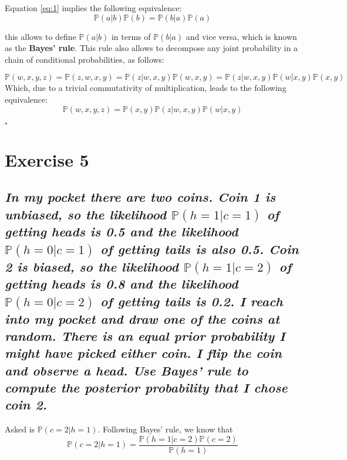 \documentclass[11pt]{scrartcl} %
\begin{document}
        Equation \ref{eq:1} implies the following equivalence:
        \begin{equation}\label{eq:3}
          \mathbb{P}(a|b)\mathbb{P}(b) = \mathbb{P}(b|a)\mathbb{P}(a)
        \end{equation}

        this allows to define \(\mathbb{P}(a|b)\) in terms of \(\mathbb{P}(b|a)\) and vice versa, which is known as the \textbf{Bayes' rule}. This rule also allows to decompose any joint probability in a chain of conditional probabilities, as follows:

        \begin{equation}\label{eq:4}
          \mathbb{P}(w,x,y,z) = \mathbb{P}(z,w,x,y) = \mathbb{P}(z|w,x,y)\mathbb{P}(w,x,y) = \mathbb{P}(z|w,x,y)\mathbb{P}(w|x,y)\mathbb{P}(x,y)
        \end{equation}
        Which, due to a trivial commutativity of multiplication, leads to the following equivalence:
        \begin{equation}\label{eq:5}
          \mathbb{P}(w,x,y,z) = \mathbb{P}(x,y)\mathbb{P}(z|w, x, y)\mathbb{P}(w|x, y)
        \end{equation}
        \begin{flushright}
		$\square$\\
	\end{flushright}



\vspace{5mm}
        \section*{Exercise 5}
        \subsection*{{\it In my pocket there are two coins. Coin 1 is unbiased, so the likelihood \(\mathbb{P}(h = 1|c = 1)\) of getting heads is 0.5 and the likelihood \(\mathbb{P}(h =0|c = 1)\) of getting tails is also 0.5. Coin 2 is biased, so the likelihood \(\mathbb{P}(h =1|c = 2)\) of getting heads is 0.8 and the likelihood \(\mathbb{P}(h = 0|c = 2)\) of getting tails is 0.2. I reach into my pocket and draw one of the coins at random. There is an equal prior probability I might have picked either coin. I flip the coin and observe a head. Use Bayes’ rule to compute the posterior probability that I chose coin 2.}}

        Asked is \(\mathbb{P}(c=2|h=1)\). Following Bayes' rule, we know that
        \begin{equation}\label{eq:6}
          \mathbb{P}(c=2|h=1) = \frac{\mathbb{P}(h=1|c=2)\mathbb{P}(c=2)}{\mathbb{P}(h=1)}
        \end{equation}
\end{document}
